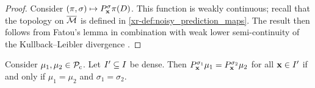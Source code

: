 \documentclass[12pt, twoside]{report}
\newcommand{\xrprefix}[1]{xr-#1}
\begin{document}
\begin{proof}
    Consider $(\pi, \sigma) \mapsto P^\sigma_{\mathbf{x}} \pi(D)$.
    This function is weakly continuous;
    recall that the topology on $\overline{\mathcal{M}}$ is defined in
    \cref{\xrprefix{def:noisy_prediction_maps}}.
    The result then follows from Fatou's lemma in combination with weak lower semi-continuity of the Kullback--Leibler divergence \parencite{Posner:1975:Random_Coding_Strategies_for_Minimum}.
\end{proof}

\begin{lemma} \label{lem:equality_dense}
    Consider $\mu_1, \mu_2 \in \Pc\ss{c}$.
    Let $I' \subseteq I$ be dense.
    Then $P^{\sigma_1}_{\mathbf{x}} \mu_1 = P^{\sigma_2}_{\mathbf{x}} \mu_2$ for all $\mathbf{x} \in I'$ if and only if $\mu_1 = \mu_2$ and $\sigma_1 = \sigma_2$.
\end{lemma}
\end{document}
